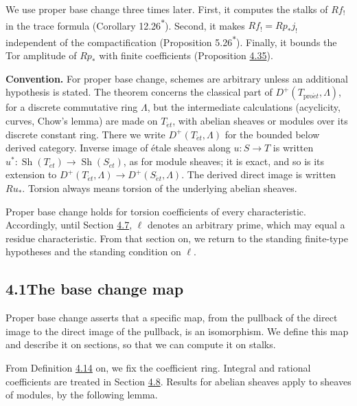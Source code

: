 \documentclass[11pt]{article}
\newcommand{\bpout}[1]{#1\textsuperscript{\hyperlink{bp-outside}{\ensuremath{\ast}}}}
\providecommand{\Sh}{}\renewcommand{\Sh}{\operatorname{Sh}}
\begin{document}
We use proper base change three times later. First, it computes the stalks of \(Rf_!\) in the trace formula (Corollary \bpout{12.26}). Second, it makes \(Rf_!=Rp_*j_!\) independent of the compactification (Proposition \bpout{5.26}). Finally, it bounds the Tor amplitude of \(Rp_*\) with finite coefficients (Proposition \hyperref[bp106]{4.35}).

\label{bp5}%
\textbf{Convention.} For proper base change, schemes are arbitrary unless an additional hypothesis is stated. The theorem concerns the classical part of \(D^+(T_{\mathrm{pro}\acute{e}t},\Lambda)\), for a discrete commutative ring \(\Lambda\), but the intermediate calculations (acyclicity, curves, Chow's lemma) are made on \(T_{\acute{e}t}\), with abelian sheaves or modules over its discrete constant ring. There we write \(D^+(T_{\acute{e}t},\Lambda)\) for the bounded below derived category. Inverse image of étale sheaves along \(u:S\to T\) is written \(u^*:\Sh(T_{\acute{e}t})\to\Sh(S_{\acute{e}t})\), as for module sheaves; it is exact, and so is its extension to \(D^+(T_{\acute{e}t},\Lambda)\to D^+(S_{\acute{e}t},\Lambda)\). The derived direct image is written \(Ru_*\). Torsion always means torsion of the underlying abelian sheaves.

Proper base change holds for torsion coefficients of every characteristic. Accordingly, until Section \hyperref[bp104]{4.7}, \(\ell\) denotes an arbitrary prime, which may equal a residue characteristic. From that section on, we return to the standing finite-type hypotheses and the standing condition on \(\ell\).

\subsection*{\texorpdfstring{4.1\quad The base change map}{4.1 The base change map}}
\label{bp6}%
\label{bp7}%
Proper base change asserts that a specific map, from the pullback of the direct image to the direct image of the pullback, is an isomorphism. We define this map and describe it on sections, so that we can compute it on stalks.

From Definition \hyperref[bp38]{4.14} on, we fix the coefficient ring. Integral and rational coefficients are treated in Section \hyperref[bp108]{4.8}. Results for abelian sheaves apply to sheaves of modules, by the following lemma.
\end{document}

